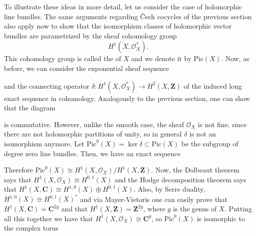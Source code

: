 \documentclass[12pt,a4paper]{book}
\theoremstyle{definition} \newtheorem{defn}[thm]{Definition}
\theoremstyle{definition} \newtheorem{ejemplo}[thm]{Example}
\theoremstyle{remark} \newtheorem*{rem}{Remark}
\def\OO{\mathscr{O}}
\def\CC{\mathbf{C}}
\def\ZZ{\mathbf{Z}}
\def\Pic{\mathrm{Pic}}
\let\emph\relax
\begin{document}
       To illustrate these ideas in more detail, let us consider the case of holomorphic line bundles. The same arguments regarding \v{C}ech cocycles of the previous section also apply now to show that the isomorphism classes of holomorphic vector bundles are parametrized by the sheaf cohomology group
       \begin{equation*}
	 H^1(X,\OO_X^*).
       \end{equation*}
       This cohomology group is called the \emph{Picard group} of $X$ and we denote it by $\Pic(X)$.
       Now, as before, we can consider the exponential sheaf sequence
      \begin{center}
       \end{center}
       and the connecting operator $\delta:H^1(X,\OO_X^*)\rightarrow H^2(X,\ZZ)$ of the induced long exact sequence in cohomology. Analogously to the previous section, one can show that the diagram 
      \begin{center}
       \end{center}
       is commutative. However, unlike the smooth case, the sheaf $\OO_X$ is not fine, since there are not holomorphic partitions of unity, so in general $\delta$ is not an isomorphism anymore. Let $\Pic^0(X)=\ker \delta \subset \Pic(X)$ be the subgroup of degree zero line bundles. Then, we have an exact sequence
      \begin{center}
       \end{center}
       Therefore $\Pic^0(X)\cong H^1(X,\OO_X)/H^1(X,\ZZ)$. Now, the Dolbeaut theorem says that $H^1(X,\OO_X)\cong H^{0,1}(X)$ and the Hodge decomposition theorem says that $H^1(X,\CC)\cong H^{1,0}(X) \oplus H^{0,1}(X)$. Also, by Serre duality, $H^{1,0}(X)\cong H^{0,1}(X)^*$ and via Mayer-Vietoris one can easily prove that $H^1(X,\CC)=\CC^{2g}$ and that $H^1(X,\ZZ)=\ZZ^{2g}$, where $g$ is the genus of $X$. Putting all this together we have that $H^1(X,\OO_X)\cong \CC^{g}$, so $\Pic^0(X)$ is isomorphic to the complex torus
\end{document}
